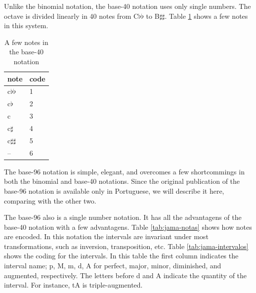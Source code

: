 \documentclass{article}
\begin{document}
Unlike the binomial notation, the base-40 notation uses only single
numbers. The octave is divided linearly in 40 notes from C$\flat\flat$
to B$\sharp\sharp$. Table \ref{tab:base40} shows a few notes in this
system.

\begin{table}
  \centering
  \begin{tabular}{l|l}
    note & code \\
    \hline
    c$\flat\flat$ & 1 \\
    c$\flat$ & 2 \\
    c & 3 \\
    c$\sharp$ & 4 \\
    c$\sharp\sharp$ & 5 \\
    -- & 6 \\
  \end{tabular}
  \caption{A few notes in the base-40 notation}
  \label{tab:base40}
\end{table}

The base-96 notation is simple, elegant, and overcomes a few
shortcommings in both the binomial and base-40 notations. Since the
original publication of the base-96 notation is available only in
Portuguese, we will describe it here, comparing with the other
two.

The base-96 also is a single number notation. It has all the
advantagens of the base-40 notation with a few advantagens. Table
\ref{tab:jama-notas} shows how notes are encoded. In this notation the
intervals are invariant under most transformations, such as inversion,
transposition, etc. Table \ref{tab:jama-intervalos} shows the coding
for the intervals. In this table the first column indicates the
interval name; p, M, m, d, A for perfect, major, minor, diminished,
and augmented, respectively. The letters before d and A indicate the
quantity of the interval. For instance, tA is triple-augmented.
\end{document}
